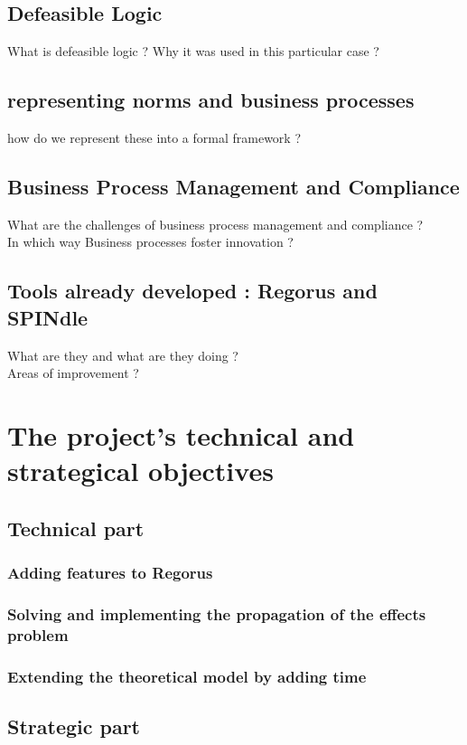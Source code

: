 \documentclass[10pt]{article}
\begin{document}
\subsection{Defeasible Logic}
What is defeasible logic ?
Why it was used in this particular case ?

\subsection{representing norms and business processes}
how do we represent these into a formal framework ?
\lipsum[1-25]

\subsection{Business Process Management and Compliance}
What are the challenges of business process management and compliance ?\\
In which way Business processes foster innovation ?

\subsection{Tools already developed : Regorus and SPINdle}
What are they and what are they doing ?\\
Areas of improvement ?


\newpage

\section{The project's technical and strategical objectives}
\subsection{Technical part}
\subsubsection{Adding features to Regorus}
\subsubsection{Solving and implementing the propagation of the effects problem}
\subsubsection{Extending the theoretical model by adding time}

\subsection{Strategic part}
\end{document}
